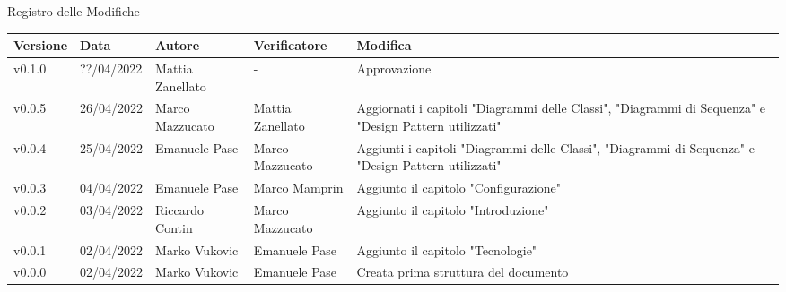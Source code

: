 \begin{center}
  \huge{Registro delle Modifiche}
\end{center}
\renewcommand\arraystretch{1,5}
{\centering
\begin{longtable}{|C{1.8cm}|C{2.1cm}|C{2cm}|C{2.4cm}|L{4.4cm}|}
  \hline
  \textcolor[HTML]{FFFFFF}{\textbf{Versione}} & \textcolor[HTML]{FFFFFF}{\textbf{Data}} & \textcolor[HTML]{FFFFFF}{\textbf{Autore}}  & \textcolor[HTML]{FFFFFF}{\textbf{Verificatore}} & \textcolor[HTML]{FFFFFF}{\textbf{Modifica}}    \\ \hline
  v0.1.0        & ??/04/2022    & Mattia Zanellato   &  -       & Approvazione \\ \hline
  v0.0.5        & 26/04/2022    & Marco Mazzucato   & Mattia Zanellato   & Aggiornati i capitoli "Diagrammi delle Classi", "Diagrammi di Sequenza" e "Design Pattern utilizzati" \\ \hline
  v0.0.4        & 25/04/2022    & Emanuele Pase   &  Marco Mazzucato       & Aggiunti i capitoli "Diagrammi delle Classi", "Diagrammi di Sequenza" e "Design Pattern utilizzati" \\ \hline
  v0.0.3        & 04/04/2022    & Emanuele Pase   &  Marco Mamprin  & Aggiunto il capitolo "Configurazione" \\ \hline
  v0.0.2        & 03/04/2022    & Riccardo Contin   &   Marco Mazzucato   & Aggiunto il capitolo "Introduzione" \\ \hline
  v0.0.1        & 02/04/2022    & Marko Vukovic   & Emanuele Pase         & Aggiunto il capitolo "Tecnologie" \\ \hline
  v0.0.0        & 02/04/2022    & Marko Vukovic   & Emanuele Pase         & Creata prima struttura del documento \\ \hline
\end{longtable}}

\renewcommand\arraystretch{1}

